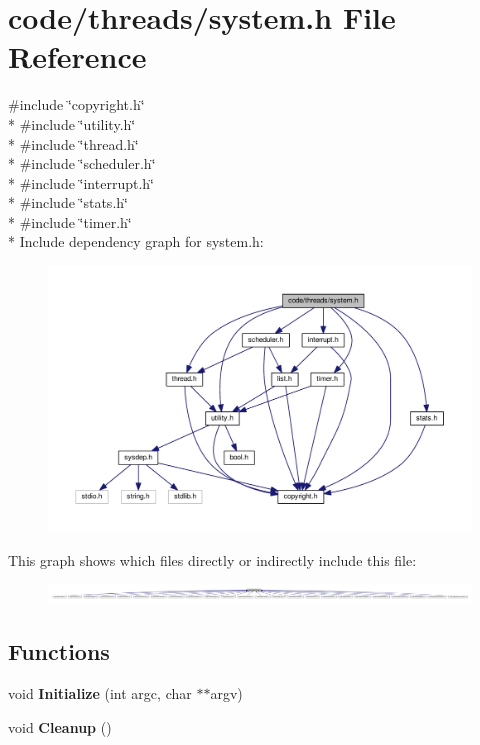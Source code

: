 \section{code/threads/system.h File Reference}
\label{system_8h}
{\ttfamily \#include \char`\"{}copyright.\+h\char`\"{}}\\*
{\ttfamily \#include \char`\"{}utility.\+h\char`\"{}}\\*
{\ttfamily \#include \char`\"{}thread.\+h\char`\"{}}\\*
{\ttfamily \#include \char`\"{}scheduler.\+h\char`\"{}}\\*
{\ttfamily \#include \char`\"{}interrupt.\+h\char`\"{}}\\*
{\ttfamily \#include \char`\"{}stats.\+h\char`\"{}}\\*
{\ttfamily \#include \char`\"{}timer.\+h\char`\"{}}\\*
Include dependency graph for system.\+h\+:
\nopagebreak
\begin{figure}[H]
\begin{center}
\leavevmode
\includegraphics[width=350pt]{system_8h__incl}
\end{center}
\end{figure}
This graph shows which files directly or indirectly include this file\+:
\nopagebreak
\begin{figure}[H]
\begin{center}
\leavevmode
\includegraphics[width=350pt]{system_8h__dep__incl}
\end{center}
\end{figure}
\subsection*{Functions}
\begin{DoxyCompactItemize}
\item 
void {\bf Initialize} (int argc, char $\ast$$\ast$argv)
\item 
void {\bf Cleanup} ()
\end{DoxyCompactItemize}
